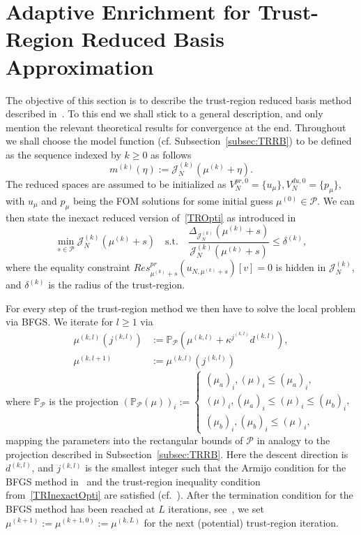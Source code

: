 \section{Adaptive Enrichment for Trust-Region Reduced Basis Approximation}\label{sec:AdapTRRBAlg}

The objective of this section is to describe the trust-region reduced basis method described in~\cite[Section 4]{Keil2021}.
To this end we shall stick to a general description, and only mention the relevant theoretical results for convergence at the end.
Throughout we shall choose the model function (cf. Subsection~\ref{subsec:TRRB}) to be defined as the sequence indexed by $k \geq 0$ as follows
\begin{equation*}\label{TRModelFunc}
    m^{(k)}(\eta) := \mathcal{J}_N^{(k)}(\mu^{(k)} + \eta).
\end{equation*}
The reduced spaces are assumed to be initialized as $V_N^{pr, 0} = \{ u_\mu \}, V_N^{du, 0} = \{ p_\mu \}$, with $u_\mu$ and $p_\mu$ being the FOM solutions for some initial guess $\mu^{(0)} \in \mathcal{P}$.
We can then state the inexact reduced version of~\eqref{TROpti} as introduced in~\cite[Equation 51]{Qian2017}
\begin{equation}\label{TRInexactOpti}
    \min\limits_{s \in \mathcal{P}} \mathcal{J}_N^{(k)}(\mu^{(k)} + s) \quad \text{s.t.} \quad \frac{\Delta_{\mathcal{J}_N^{(k)}}(\mu^{(k)} + s)}{\mathcal{J}_N^{(k)}(\mu^{(k)} + s)} \leq \delta^{(k)},
\end{equation}
where the equality constraint $Res_{\mu^{(k)} + s}^{pr} (u_{N, \mu^{(k)} + s})[v] = 0$ is hidden in $\mathcal{J}_N^{(k)}$, and $\delta^{(k)}$ is the radius of the trust-region.

For every step of the trust-region method we then have to solve the local problem via BFGS.\@
We iterate for $ l \geq 1$ via
\begin{align*}
    \mu^{(k, l)}(j^{(k, l)}) &:= \mathbb{P}_\mathcal{P} \left( \mu^{(k, l)} + \kappa^{j^{(k, l)}} d^{(k, l)} \right), \\
    \mu^{(k, l+ 1)} &:= \mu^{(k, l)}(j^{(k, l)})
\end{align*}
where $\mathbb{P}_\mathcal{P}$ is the projection ${\left( \mathbb{P}_\mathcal{P}(\mu) \right)}_i := \begin{cases}
    {(\mu_a)}_i, {(\mu)}_i \leq {(\mu_a)}_i, \\
    {(\mu)}_i, {(\mu_a)}_i \leq {(\mu)}_i \leq {(\mu_b)}_i, \\
    {(\mu_b)}_i, {(\mu_b)}_i \leq {(\mu)}_i,
\end{cases}$
mapping the parameters into the rectangular bounds of $\mathcal{P}$ in analogy to the projection described in Subsection~\ref{subsec:TRRB}.
Here the descent direction is $d^{(k, l)}$, and $j^{(k, l)}$ is the smallest integer such that the Armijo condition for the BFGS method in~\cite[Inequality 4.4]{Keil2021} and the trust-region inequality condition from~\eqref{TRInexactOpti} are satisfied (cf.~\cite[Inequality 4.5]{Keil2021}).
After the termination condition for the BFGS method has been reached at $L$ iterations, see~\cite[Inequalities 4.6a and 4.6b]{Keil2021}, we set $\mu^{(k + 1)} :=\mu^{(k + 1, 0)} := \mu^{(k, L)}$ for the next (potential) trust-region iteration.

